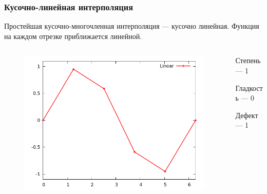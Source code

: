 \documentclass[aspectratio=43,unicode]{beamer}
\begin{document}
\begin{frame}
\frametitle{Кусочно-линейная интерполяция}
	Простейшая кусочно-многочленная интерполяция --- кусочно линейная.
	Функция на каждом отрезке приближается линейной.

	\begin{columns}[c]
	\begin{column}{0.6\textwidth}
	\begin{figure}
	\center
	\includegraphics[width=\textwidth]{spline1_1.png}%
	\end{figure}
	\end{column}
	\begin{column}{0.4\textwidth}
	Степень --- 1

	Гладкость --- 0

	Дефект --- 1
	\end{column}
	\end{columns}
\end{frame}
\end{document}
